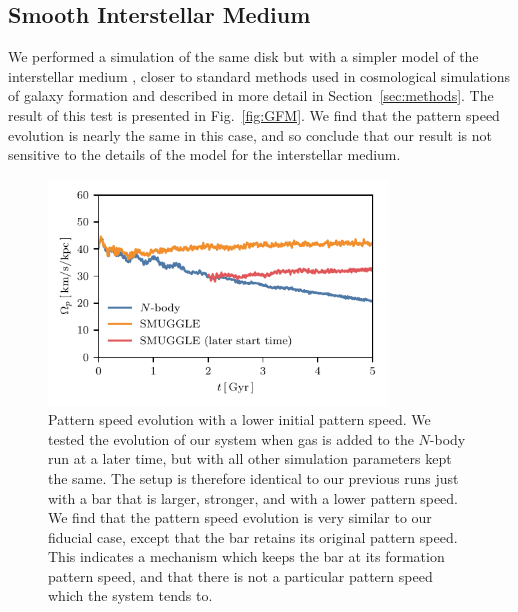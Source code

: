 \documentclass[twocolumn,linenumbers,trackchanges]{aastex631}
\newcommand{\Nbody}{$N$-body}
\begin{document}
\subsection{Smooth Interstellar Medium}
We performed a simulation of the same disk but with a simpler model of the
interstellar medium \citep{2003MNRAS.339..289S}, closer to standard methods used
in cosmological simulations of galaxy formation and described in more detail in
Section~\ref{sec:methods}. The result of this test is presented in
Fig.~\ref{fig:GFM}. We find that the pattern speed evolution is nearly the same
in this case, and so conclude that our result is not sensitive to the details of
the model for the interstellar medium.

\begin{figure}
    \centering
    \includegraphics[width=9cm]{fig/ps_late_start.pdf}
    \caption{Pattern speed evolution with a lower initial pattern speed. We
    tested the evolution of our system when gas is added to the \Nbody{} run at
    a later time, but with all other simulation parameters kept the same. The
    setup is therefore identical to our previous runs just with a bar that is
    larger, stronger, and with a lower pattern speed. We find that the pattern
    speed evolution is very similar to our fiducial case, except that the bar
    retains its original pattern speed. This indicates a mechanism which keeps
    the bar at its formation pattern speed, and that there is not a particular
    pattern speed which the system tends to.}
    \label{fig:snap700}
\end{figure}
\end{document}
